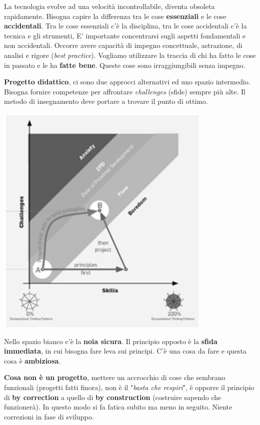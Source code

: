 

La tecnologia evolve ad una velocità incontrollabile, diventa obsoleta rapidamente. Bisogna capire la differenza tra le cose \textbf{essenziali} e le cose \textbf{accidentali}. Tra le cose essenziali c'è la disciplina, tra le cose accidentali c'è la tecnica e gli strumenti, E' importante concentrarsi sugli aspetti fondamentali e non accidentali. Occorre avere capacità di impegno concettuale, astrazione, di analisi e rigore (\textit{best practice}). Vogliamo utilizzare la traccia di chi ha fatto le cose in passato e le ha \textbf{fatte bene}. Queste cose sono irraggiungibili senza impegno.

\textbf{Progetto didattico}, ci sono due approcci alternativi ed uno spazio intermedio. Bisogna fornire competenze per affrontare \textit{challenges} (sfide) sempre più alte. Il metodo di insegnamento deve portare a trovare il punto di ottimo.

\begin{center}

\includegraphics[width=0.75\columnwidth]{img1} %

\end{center}

Nello spazio bianco c'è la \textbf{noia sicura}. Il principio opposto è la \textbf{sfida immediata}, in cui bisogna fare leva sui principi. C'è una cosa da fare e questa cosa è \textbf{ambiziosa}.

\textbf{Cosa non è un progetto}, mettere un accrocchio di cose che sembrano funzionali (progetti fatti finora), non è il "\textit{basta che respiri}", è opporre  il principio di \textbf{by correction} a quello di \textbf{by construction} (costruire sapendo che funzionerà). In questo modo si fa fatica subito ma meno in seguito. Niente correzioni in fase di sviluppo.

